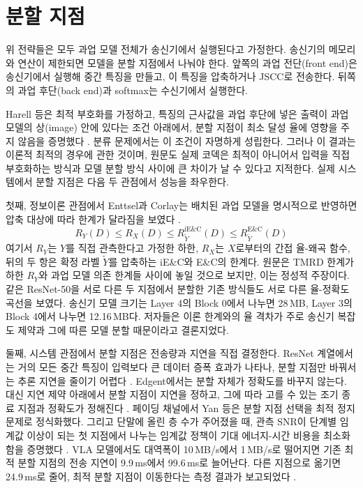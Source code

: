 \documentclass[11pt,a4paper]{article}
\newcommand{\Yt}{\tilde{Y}}
\begin{document}
\section{분할 지점}

위 전략들은 모두 과업 모델 전체가 송신기에서 실행된다고 가정한다. 송신기의 메모리와 연산이 제한되면 모델을 분할 지점에서 나눠야 한다. 앞쪽의 과업 전단(front end)은 송신기에서 실행해 중간 특징을 만들고, 이 특징을 압축하거나 JSCC로 전송한다. 뒤쪽의 과업 후단(back end)과 softmax는 수신기에서 실행한다.

Harell 등은 최적 부호화를 가정하고, 특징의 근사값을 과업 후단에 넣은 출력이 과업 모델의 상(image) 안에 있다는 조건 아래에서, 분할 지점이 최소 달성 율에 영향을 주지 않음을 증명했다 \cite{harell2025}. 분류 문제에서는 이 조건이 자명하게 성립한다. 그러나 이 결과는 이론적 최적의 경우에 관한 것이며, 원문도 실제 코덱은 최적이 아니어서 입력을 직접 부호화하는 방식과 모델 분할 방식 사이에 큰 차이가 날 수 있다고 지적한다. 실제 시스템에서 분할 지점은 다음 두 관점에서 성능을 좌우한다.

첫째, 정보이론 관점에서 Enttsel과 Corlay는 배치된 과업 모델을 명시적으로 반영하면 압축 대상에 따라 한계가 달라짐을 보였다 \cite{enttsel2026}.
\begin{equation}
R_Y(D) \le R_X(D) \le R_{\Yt}^{\mathrm{iE\&C}}(D) \le R_{\Yt}^{\mathrm{E\&C}}(D)
\label{eq:order}
\end{equation}
여기서 $R_Y$는 $Y$를 직접 관측한다고 가정한 하한, $R_X$는 $X$로부터의 간접 율-왜곡 함수, 뒤의 두 항은 확정 라벨 $\Yt$를 압축하는 iE\&C와 E\&C의 한계다. 원문은 TMRD 한계가 하한 $R_Y$와 과업 모델 의존 한계들 사이에 놓일 것으로 보지만, 이는 정성적 주장이다. 같은 ResNet-50을 서로 다른 두 지점에서 분할한 기존 방식들도 서로 다른 율-정확도 곡선을 보였다. 송신기 모델 크기는 Layer 4의 Block 0에서 나누면 28\,MB, Layer 3의 Block 4에서 나누면 12.16\,MB다. 저자들은 이론 한계와의 율 격차가 주로 송신기 복잡도 제약과 그에 따른 모델 분할 때문이라고 결론지었다.

둘째, 시스템 관점에서 분할 지점은 전송량과 지연을 직접 결정한다. ResNet 계열에서는 거의 모든 중간 특징이 입력보다 큰 데이터 증폭 효과가 나타나, 분할 지점만 바꿔서는 추론 지연을 줄이기 어렵다 \cite{shao2020tradeoff}. Edgent에서는 분할 자체가 정확도를 바꾸지 않는다. 대신 지연 제약 아래에서 분할 지점이 지연을 정하고, 그에 따라 고를 수 있는 조기 종료 지점과 정확도가 정해진다 \cite{li2020edgent}. 페이딩 채널에서 Yan 등은 분할 지점 선택을 최적 정지 문제로 정식화했다. 그리고 단말에 올린 층 수가 주어졌을 때, 관측 SNR이 단계별 임계값 이상이 되는 첫 지점에서 나누는 임계값 정책이 기대 에너지-시간 비용을 최소화함을 증명했다 \cite{yan2021split}. VLA 모델에서도 대역폭이 10\,MB/s에서 1\,MB/s로 떨어지면 기존 최적 분할 지점의 전송 지연이 9.9\,ms에서 99.6\,ms로 늘어난다. 다른 지점으로 옮기면 24.9\,ms로 줄어, 최적 분할 지점이 이동한다는 측정 결과가 보고되었다 \cite{zheng2026roboecc}.
\end{document}
